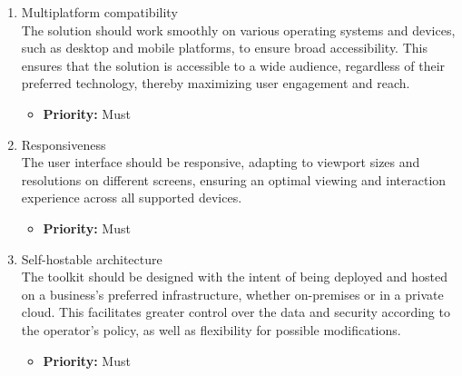 \begin{enumerate}[label=\textbf{NF\arabic*:}, leftmargin=*]

\item \label{itm:NF1} Multiplatform compatibility
\vspace{2pt}
\\The solution should work smoothly on various operating systems and devices, such as desktop and mobile platforms, to ensure broad accessibility. This ensures that the solution is accessible to a wide audience, regardless of their preferred technology, thereby maximizing user engagement and reach.
\begin{itemize}[noitemsep, label=\trianglebullet]
    \item \textbf{Priority:} Must
\end{itemize}
\vspace{4pt}

\item \label{itm:NF2} Responsiveness
\vspace{2pt}
\\The user interface should be responsive, adapting to viewport sizes and resolutions on different screens, ensuring an optimal viewing and interaction experience across all supported devices.
\begin{itemize}[noitemsep, label=\trianglebullet]
    \item \textbf{Priority:} Must
\end{itemize}
\vspace{4pt}

\item \label{itm:NF3} Self-hostable architecture
\vspace{2pt}
\\The toolkit should be designed with the intent of being deployed and hosted on a business's preferred infrastructure, whether on-premises or in a private cloud. This facilitates greater control over the data and security according to the operator's policy, as well as flexibility for possible modifications.
\begin{itemize}[noitemsep, label=\trianglebullet]
    \item \textbf{Priority:} Must
\end{itemize}
\vspace{4pt}


\end{enumerate}
